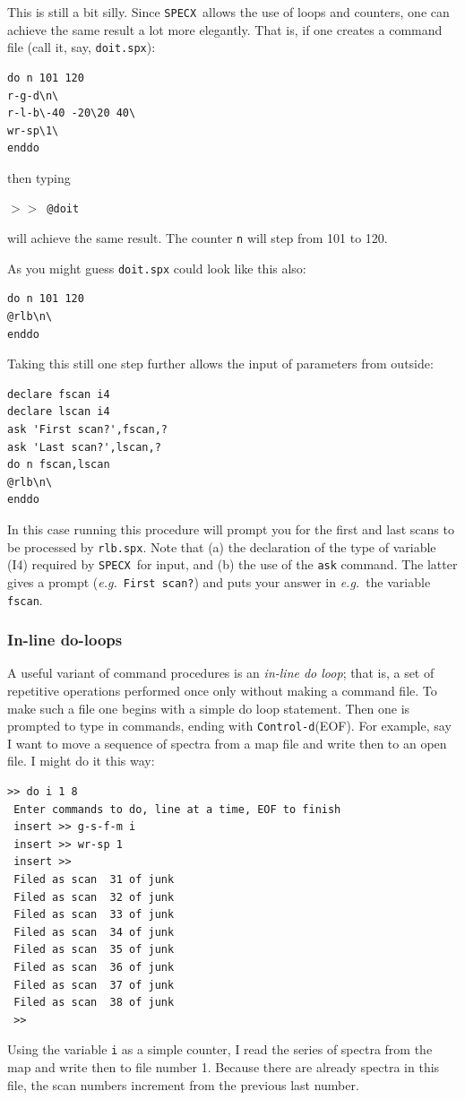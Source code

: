 \documentclass[11pt,twoside]{article}
\newcommand{\eg}{{\it e.g.}}
\newcommand{\SPECX}{{\tt SPECX}}
\newcommand{\SP}{{$>\!>$}}
\newcommand{\ctrld}{{\tt Control-d}}
\begin{document}
This is still a bit silly. Since \SPECX\ allows the use of loops and
counters, one can achieve the same result a lot more elegantly. That
is, if one creates a command file (call it, say, {\tt doit.spx}):

\begin{verbatim}
do n 101 120
r-g-d\n\ 
r-l-b\-40 -20\20 40\ 
wr-sp\1\ 
enddo
\end{verbatim}

then typing

\SP\ \verb|@doit|

will achieve the same result. The counter {\tt n} will step from 101
to 120.

As you might guess {\tt doit.spx} could look like this also:

\begin{verbatim}
do n 101 120
@rlb\n\
enddo
\end{verbatim}

Taking this still one step further allows the input of parameters from
outside:

\begin{verbatim}
declare fscan i4
declare lscan i4
ask 'First scan?',fscan,?
ask 'Last scan?',lscan,?
do n fscan,lscan
@rlb\n\
enddo
\end{verbatim}

In this case running this procedure will prompt you for the first and
last scans to be processed by {\tt rlb.spx}. Note that (a) the
declaration of the type of variable (I4) required by \SPECX\ for
input, and (b) the use of the {\tt ask} command. The latter gives a
prompt (\eg\ {\tt First scan?}) and puts your answer in \eg\ the
variable {\tt fscan}.

\subsubsection{In-line do-loops}
\label{sec:do-loops}
A useful variant of command procedures is an {\it in-line do loop};
that is, a set of repetitive operations performed once only without
making a command file. To make such a file one begins with a simple do
loop statement. Then one is prompted to type in commands, ending with
\ctrld (EOF). For example, say I want to move a sequence of spectra
from a map file and write then to an open file. I might do it this
way:
\begin{verbatim}
>> do i 1 8
 Enter commands to do, line at a time, EOF to finish
 insert >> g-s-f-m i
 insert >> wr-sp 1
 insert >>  
 Filed as scan  31 of junk                    
 Filed as scan  32 of junk                       
 Filed as scan  33 of junk                       
 Filed as scan  34 of junk                       
 Filed as scan  35 of junk                       
 Filed as scan  36 of junk                       
 Filed as scan  37 of junk                       
 Filed as scan  38 of junk                       
 >>
\end{verbatim}
Using the variable {\tt i} as a simple counter, I read the series of
spectra from the map and write then to file number 1. Because there
are already spectra in this file, the scan numbers increment from the
previous last number.
\end{document}
